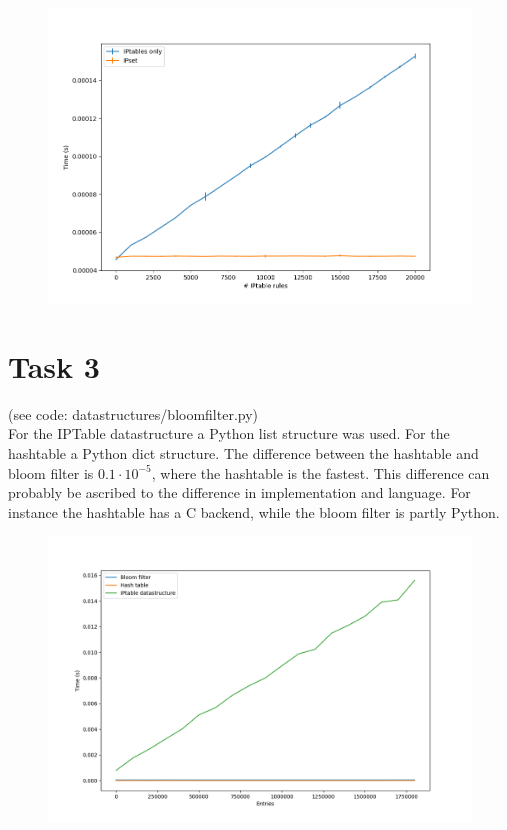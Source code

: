 \documentclass{article}
\begin{document}
\begin{figure}[H]
\includegraphics[scale=0.6]{task2}
\end{figure}

\section{Task 3}
(see code: datastructures/bloomfilter.py) \\
For the IPTable datastructure a Python list structure was used. For the hashtable a Python dict structure. The difference between the hashtable and bloom filter is $0.1\cdot10^{-5}$, where the hashtable is the fastest. This difference can probably be ascribed to the difference in implementation and language. For instance the hashtable has a C backend, while the bloom filter is partly Python.
\begin{figure}[H]
\includegraphics[scale=0.55]{task3}
\end{figure}
\end{document}
